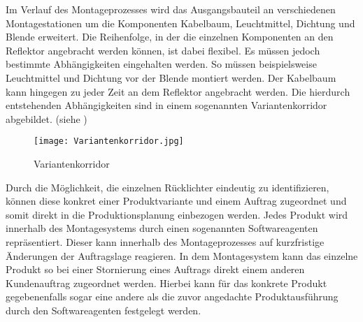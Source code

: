 Im Verlauf des Montageprozesses wird das Ausgangsbauteil an verschiedenen
Montagestationen um die Komponenten Kabelbaum, Leuchtmittel, Dichtung und
Blende erweitert. Die Reihenfolge, in der die einzelnen Komponenten an den
Reflektor angebracht werden können, ist dabei flexibel. Es müssen jedoch
bestimmte Abhängigkeiten eingehalten werden. So müssen beispielsweise 
Leuchtmittel und Dichtung vor der Blende montiert werden. Der Kabelbaum kann
hingegen zu jeder Zeit an dem Reflektor angebracht werden. Die hierdurch
entstehenden Abhängigkeiten sind in einem sogenannten Variantenkorridor
abgebildet. (siehe )

\begin{figure}[htb] 
\centering
\texttt{[image: Variantenkorridor.jpg]}
\caption[Variantenkorridor]{Variantenkorridor\protect\footnotemark}
\label{fig:Variantenkorridor}
\end{figure}

Durch die Möglichkeit, die einzelnen Rücklichter eindeutig zu identifizieren,
können diese konkret einer Produktvariante und einem Auftrag zugeordnet und
somit direkt in die Produktionsplanung einbezogen werden. Jedes Produkt wird
innerhalb des Montagesystems durch einen sogenannten Softwareagenten
repräsentiert. Dieser kann innerhalb des Montageprozesses auf kurzfristige
Änderungen der Auftragslage reagieren. In dem Montagesystem kann das einzelne 
Produkt so bei einer Stornierung eines Auftrags direkt einem anderen
Kundenauftrag zugeordnet werden. Hierbei kann für das konkrete Produkt
gegebenenfalls sogar eine andere als die zuvor angedachte Produktausführung
durch den Softwareagenten festgelegt werden.